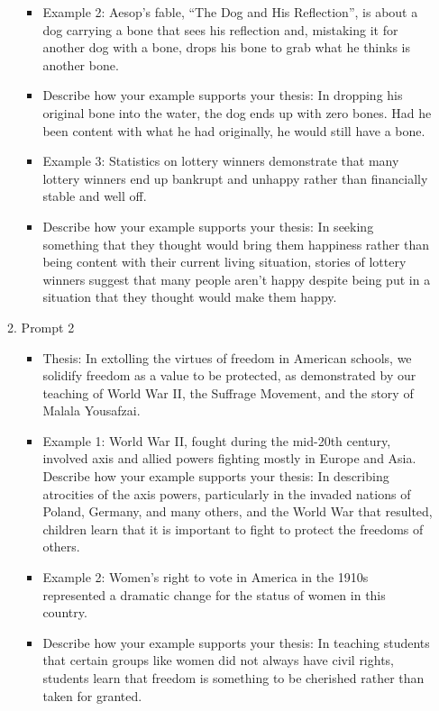 \begin{enumerate}
\begin{enumerate}
\begin{itemize}
\item Example 2: Aesop’s fable, ``The Dog and His Reflection'', is about a dog carrying a bone that sees his reflection and, mistaking it for another dog with a bone, drops his bone to grab what he thinks is another bone. 
\item Describe how your example supports your thesis: In dropping his original bone into the water, the dog ends up with zero bones. Had he been content with what he had originally, he would still have a bone. 

\item Example 3: Statistics on lottery winners demonstrate that many lottery winners end up bankrupt and unhappy rather than financially stable and well off. 
\item Describe how your example supports your thesis: In seeking something that they thought would bring them happiness rather than being content with their current living situation, stories of lottery winners suggest that many people aren’t happy despite being put in a situation that they thought would make them happy. 
\end{itemize}

\item Prompt 2

\begin{itemize}
\item Thesis: In extolling the virtues of freedom in American schools, we solidify freedom as a value to be protected, as demonstrated by our teaching of World War II, the Suffrage Movement, and the story of Malala Yousafzai. 
\item Example 1: World War II, fought during the mid-20th century, involved axis and allied powers fighting mostly in Europe and Asia. 
Describe how your example supports your thesis: In describing atrocities of the axis powers, particularly in the invaded nations of Poland, Germany, and many others, and the World War that resulted, children learn that it is important to fight to protect the freedoms of others. 

\item Example 2: Women’s right to vote in America in the 1910s represented a dramatic change for the status of women in this country.

\item Describe how your example supports your thesis: In teaching students that certain groups like women did not always have civil rights, students learn that freedom is something to be cherished rather than taken for granted. 


\end{itemize}
\end{enumerate}
\end{enumerate}
